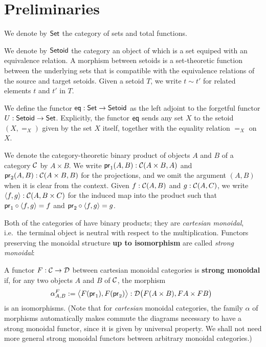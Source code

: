 \documentclass{amsart}
\newcommand{\fat}[1]{\textbf{#1}}
\begin{document}
\section{Preliminaries}\label{sec:preliminaries}


\begin{definition}\label{def:set_setoid}
 We denote by $\Set$ the category of sets and total functions. 
 
 We denote by $\Setoid$ the category an object of which is a set equiped with an equivalence relation.
 A morphism between setoids is a set-theoretic function between the underlying sets that is compatible with the equivalence relations of the source and target setoids.
 Given a setoid $T$, we write $t\sim t'$ for related elements $t$ and $t'$ in $T$.
\end{definition}



\begin{definition}\label{def:eq}
 We define the functor $\eq : \Set\to\Setoid$ as the left adjoint to the forgetful functor 
  $U : \Setoid \to \Set$.
  Explicitly, the functor $\eq$ sends any set $X$ to the setoid $(X,=_X)$ given by the set $X$ itself, together
  with the equality relation $=_X$ on $X$.
\end{definition}


\begin{remark}
  We denote the category-theoretic binary product of objects $A$ and $B$ of a category $\C$ by $A\times B$.
  We write $\pr_1(A,B) : \C(A\times B, A)$ and $\pr_2(A,B) :\C(A\times B, B)$ for the projections, and we omit the 
  argument $(A,B)$ when it is clear from the context.
  Given $f : \C(A, B)$ and $g : \C(A,C)$, we write $\langle f,g\rangle : \C(A,B\times C)$ for the induced map into the product such that
  $\comp{\langle f,g\rangle}{\pr_1} = f$ and $\comp{\langle f,g\rangle}{\pr_2} = g$.
\end{remark}

Both of the categories of  have binary products; they are \emph{cartesian monoidal}, i.e.\ the terminal 
object is neutral with respect to the multiplication. Functors preserving the monoidal structure \textbf{up to isomorphism}
are called \emph{strong monoidal}:

\begin{definition}\label{def:monoidal_functor}
 A functor $F:\C\to\D$ between cartesian monoidal categories is \fat{strong monoidal} if, for any two objects $A$ and $B$ of $\C$,
  the morphism
 \[ \alpha^F_{A,B} := \bigl\langle F(\pr_1), F(\pr_2) \bigr\rangle : \D\bigl(F(A\times B), FA\times FB\bigr)\enspace  \] 
 is an isomorphisms.
 (Note that for \emph{cartesian} monoidal categories, the family $\alpha$ of morphisms automatically makes commute the 
  diagrams necessary to have a strong monoidal functor, since it is given by universal property. 
  We shall not need more general strong monoidal functors between arbitrary monoidal categories.)
\end{definition}
\end{document}
